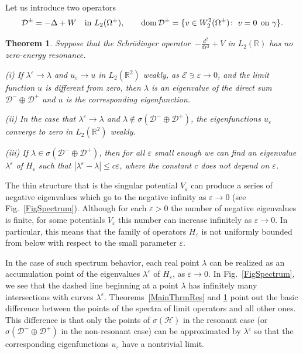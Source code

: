 \documentclass[reqno]{amsart}
\theoremstyle{plain}
\newtheorem{thm}{Theorem}
\numberwithin{equation}{section}
\newcommand{\dom}{\mathop{\rm dom}}
\newcommand{\Real}{\mathbb R}
\newcommand{\eps}{\varepsilon}
\newcommand{\cE}{\mathcal{E}}
\newcommand{\lme}{\lambda^\eps}
\newcommand{\cH}{\mathcal{H}}
\renewcommand{\leq}{\leqslant}
\begin{document}
Let us introduce two operators
\begin{equation*}
  \mathcal{D}^\pm= -\Delta+W\quad\text{in }L_2(\Omega^\pm), \qquad \dom \mathcal{D}^\pm=\{v\in W_2^2(\Omega^\pm)\colon\; v=0 \;\,\mbox{on } \gamma\}.
\end{equation*}


\begin{thm}\label{MainThrmNoRes}
Suppose that the Schr\"odinger operator~$-\frac{d^2}{d r^2}+V$ in $L_2(\Real)$ has no zero-energy resonance.

 (i) If $\lme \to \lambda$ and $u_\eps \to u$ in $L_2(\Real^2)$ weakly, as $\cE\ni\eps\to 0$, and the limit function $u$ is different from zero, then
$\lambda$ is an eigenvalue of the direct sum $\mathcal{D}^-\oplus\mathcal{D}^+$ and $u$ is the corresponding eigenfunction.


(ii) In the case that $\lme \to \lambda$ and $\lambda\not\in \sigma(\mathcal{D}^-\oplus\mathcal{D}^+)$, the eigenfunctions $u_\eps$ converge to zero in $L_2(\Real^2)$ weakly.

(iii) If $\lambda\in \sigma(\mathcal{D}^-\oplus\mathcal{D}^+)$, then for all $\eps$ small enough we can find  an eigenvalue $\lme$ of $H_\eps$ such that
$ |\lme-\lambda|\leq c\eps$,
where the constant $c$ does not depend on $\eps$.
\end{thm}




The thin structure that is the singular potential $V_\eps$ can produce a series of negative eigenvalues which go to the negative infinity as $\eps\to 0$ (see Fig.~\ref{FigSpectrum}). Although for each $\eps>0$ the number of negative eigenvalues is finite, for some potentials $V_\eps$ this number can increase infinitely as $\eps\to 0$.  In particular, this means that the family of operators $H_\eps$ is not uniformly bounded from below with respect to the small parameter $\eps$.

In the case of such spectrum behavior, each real point $\lambda$ can be realized as an accumulation point of the eigenvalues $\lme$ of $H_\eps$,  as $\eps\to 0$. In Fig.~\ref{FigSpectrum}, we see that the dashed line beginning at a point $\lambda$ has infinitely many intersections with curves $\lme$.
Theorems~\ref{MainThrmRes} and  \ref{MainThrmNoRes} point out the basic difference between the points of the spectra of  limit operators and all other ones. This difference is that only the points of $\sigma(\cH)$ in the resonant case (or $\sigma(\mathcal{D}^-\oplus\mathcal{D}^+)$ in the non-resonant case) can be approximated by $\lme$ so that the corresponding eigenfunctions $u_\eps$  have a nontrivial limit.
\end{document}

